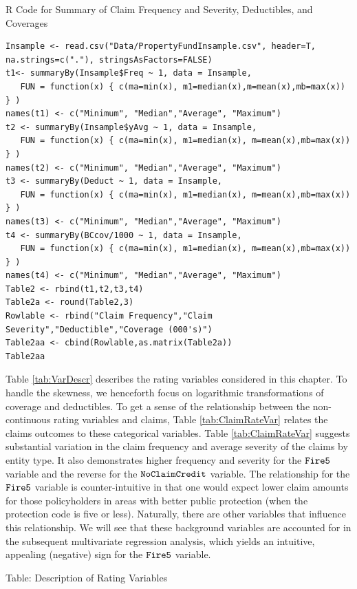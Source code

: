 \documentclass[]{book}
\theoremstyle{definition}
\theoremstyle{definition}
\theoremstyle{definition}
\theoremstyle{remark}
\begin{document}
R Code for Summary of Claim Frequency and Severity, Deductibles, and
Coverages

\hypertarget{display.DeductCov.2}{}
\begin{verbatim}
Insample <- read.csv("Data/PropertyFundInsample.csv", header=T, na.strings=c("."), stringsAsFactors=FALSE)
t1<- summaryBy(Insample$Freq ~ 1, data = Insample, 
   FUN = function(x) { c(ma=min(x), m1=median(x),m=mean(x),mb=max(x)) } )
names(t1) <- c("Minimum", "Median","Average", "Maximum")
t2 <- summaryBy(Insample$yAvg ~ 1, data = Insample, 
   FUN = function(x) { c(ma=min(x), m1=median(x), m=mean(x),mb=max(x)) } )
names(t2) <- c("Minimum", "Median","Average", "Maximum")
t3 <- summaryBy(Deduct ~ 1, data = Insample, 
   FUN = function(x) { c(ma=min(x), m1=median(x), m=mean(x),mb=max(x)) } )
names(t3) <- c("Minimum", "Median","Average", "Maximum")
t4 <- summaryBy(BCcov/1000 ~ 1, data = Insample, 
   FUN = function(x) { c(ma=min(x), m1=median(x), m=mean(x),mb=max(x)) } )
names(t4) <- c("Minimum", "Median","Average", "Maximum")
Table2 <- rbind(t1,t2,t3,t4)
Table2a <- round(Table2,3)
Rowlable <- rbind("Claim Frequency","Claim Severity","Deductible","Coverage (000's)")
Table2aa <- cbind(Rowlable,as.matrix(Table2a))
Table2aa
\end{verbatim}

Table \ref{tab:VarDescr} describes the rating variables considered in
this chapter. To handle the skewness, we henceforth focus on logarithmic
transformations of coverage and deductibles. To get a sense of the
relationship between the non-continuous rating variables and claims,
Table \ref{tab:ClaimRateVar} relates the claims outcomes to these
categorical variables. Table \ref{tab:ClaimRateVar} suggests substantial
variation in the claim frequency and average severity of the claims by
entity type. It also demonstrates higher frequency and severity for the
\({\tt Fire5}\) variable and the reverse for the \({\tt NoClaimCredit}\)
variable. The relationship for the \({\tt Fire5}\) variable is
counter-intuitive in that one would expect lower claim amounts for those
policyholders in areas with better public protection (when the
protection code is five or less). Naturally, there are other variables
that influence this relationship. We will see that these background
variables are accounted for in the subsequent multivariate regression
analysis, which yields an intuitive, appealing (negative) sign for the
\({\tt Fire5}\) variable.

Table: \label{tab:VarDescr} Description of Rating Variables
\end{document}
